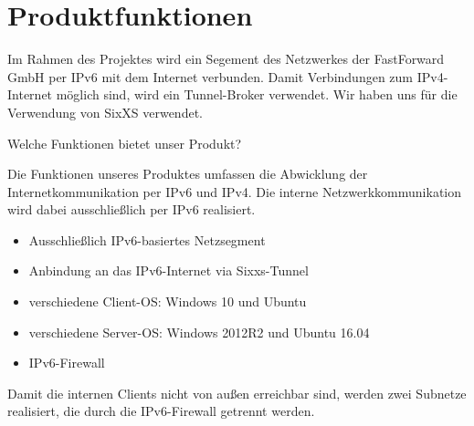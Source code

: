 \section{Produktfunktionen}

Im Rahmen des Projektes wird ein Segement des Netzwerkes der FastForward GmbH per IPv6 mit dem Internet verbunden. Damit Verbindungen zum IPv4-Internet möglich sind, wird ein Tunnel-Broker verwendet. Wir haben uns für die Verwendung von SixXS verwendet. 

Welche Funktionen bietet unser Produkt?

Die Funktionen unseres Produktes umfassen die Abwicklung der Internetkommunikation per IPv6 und IPv4. Die interne Netzwerkkommunikation wird dabei ausschließlich per IPv6 realisiert.

\begin{itemize}
	\item Ausschließlich IPv6-basiertes Netzsegment
	\item Anbindung an das IPv6-Internet via Sixxs-Tunnel
	\item verschiedene Client-OS: Windows 10 und Ubuntu
	\item verschiedene Server-OS: Windows 2012R2 und Ubuntu 16.04
	\item IPv6-Firewall
\end{itemize}

Damit die internen Clients nicht von außen erreichbar sind, werden zwei Subnetze realisiert, die durch die IPv6-Firewall getrennt werden.
